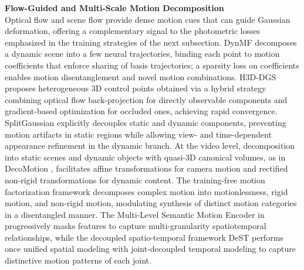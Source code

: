 \documentclass[11pt]{article}
\begin{document}
\textbf{Flow-Guided and Multi-Scale Motion Decomposition}\\
Optical flow and scene flow provide dense motion cues that can guide Gaussian deformation, offering a complementary signal to the photometric losses emphasized in the training strategies of the next subsection. DynMF \cite{ref361} decomposes a dynamic scene into a few neural trajectories, binding each point to motion coefficients that enforce sharing of basis trajectories; a sparsity loss on coefficients enables motion disentanglement and novel motion combinations. H3D-DGS \cite{ref362} proposes heterogeneous 3D control points obtained via a hybrid strategy combining optical flow back-projection for directly observable components and gradient-based optimization for occluded ones, achieving rapid convergence. SplitGaussian \cite{ref363} explicitly decouples static and dynamic components, preventing motion artifacts in static regions while allowing view- and time-dependent appearance refinement in the dynamic branch. At the video level, decomposition into static scenes and dynamic objects with quasi-3D canonical volumes, as in DecoMotion \cite{ref364}, facilitates affine transformations for camera motion and rectified non-rigid transformations for dynamic content. The training-free motion factorization framework \cite{ref365} decomposes complex motion into motionlessness, rigid motion, and non-rigid motion, modulating synthesis of distinct motion categories in a disentangled manner. The Multi-Level Semantic Motion Encoder in \cite{ref366} progressively masks features to capture multi-granularity spatiotemporal relationships, while the decoupled spatio-temporal framework DeST \cite{ref367} performs once unified spatial modeling with joint-decoupled temporal modeling to capture distinctive motion patterns of each joint.
\end{document}
